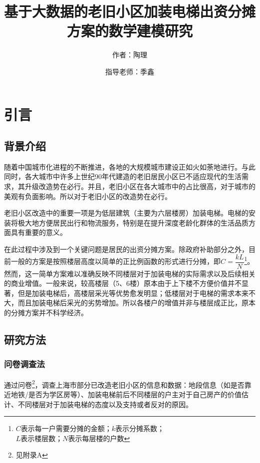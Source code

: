 \documentclass[lang=cn,a4paper]{elegantpaper}
\title{基于大数据的老旧小区加装电梯出资分摊方案的数学建模研究}
\author{作者：陶理 \and 指导老师：季鑫}
\institute{上海市实验学校}
\date{\zhtoday}
\begin{document}
    \maketitle
    
    \begin{abstract}
    \end{abstract}

    \section{引言}

    \subsection{背景介绍}

    随着中国城市化进程的不断推进，各地的大规模城市建设正如火如荼地进行。与此同时，各大城市中许多上世纪90年代建造的老旧居民小区已不适应现代的生活需求，其升级改造势在必行。并且，老旧小区在各大城市中的占比很高，对于城市的美观有负面影响。所以对于老旧小区的改造势在必行。
    
    老旧小区改造中的重要一项是为低层建筑（主要为六层楼房）加装电梯。电梯的安装将极大地方便居民出行和物流服务，特别是在提升深度老龄化群体的生活品质方面具有重要的意义。
    
    在此过程中涉及到一个关键问题是居民的出资分摊方案。除政府补助部分之外，目前一般的方案是按照楼层高度以简单的正比例函数的形式进行分摊，即$C=\dfrac{kL}{N}$\footnote{$C$表示每一户需要分摊的金额；$k$表示分摊系数；\\$L$表示楼层数；$N$表示每层楼的户数}。然而，这一简单方案难以准确反映不同楼层对于加装电梯的实际需求以及后续相关的商业增值。一般来说，较高楼层（5、6楼）原本由于上下楼不方便价值并不显著，但是加装电梯后，高楼层采光等优势愈发明显；低楼层对于电梯的需求本来不大，而且加装电梯后采光的劣势增加。所以各楼户的增值并非与楼层成正比，原本的分摊方案并不科学经济。
    
    \subsection{研究方法}

    \subsubsection{问卷调查法}
    通过问卷\footnote{见附录A}，调查上海市部分已改造老旧小区的信息和数据：地段信息（如是否靠近地铁/是否为学区房等）、加装电梯前后不同楼层的户主对于自己房产的价值估计、不同楼层对于加装电梯的态度以及支持或者反对的原因。
\end{document}
